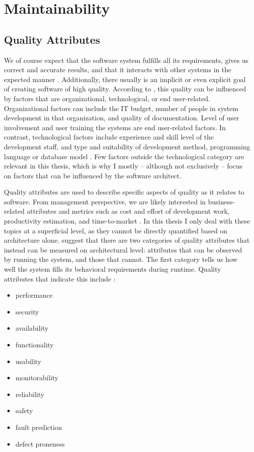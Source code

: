 \documentclass[utf8,english]{gradu3}
\begin{document}
\section{Maintainability}

\subsection{Quality Attributes}

We of course expect that the software system fulfills all its requirements, gives us correct and
accurate results, and that it interacts with other systems in the expected manner
\parencite[76]{Bass1998}. Additionally, there usually is an implicit or even explicit goal of creating software of high quality.
According to \textcite[602]{Gorla2010}, this quality
can be influenced by factors that are organizational,
technological, or end user-related. Organizational factors can
include the IT budget, number of people in system development in that
organization, and quality of documentation. Level of user involvement and user
training the systems are end user-related factors. In contrast, technological
factors include experience and skill level of the development staff, and type
and suitability of development method, programming language or database model
\parencite[602]{Gorla2010}. Few factors outside the technological category are
relevant in this thesis, which is why I mostly -- although not exclusively --
focus on factors that can be influenced by the software architect.

Quality attributes are used to describe specific aspects of quality as
it relates to software. From management perspective, we are likely interested in
business-related attributes and metrics such as cost and effort of development
work, productivity estimation, and time-to-market
\parencites[60]{Arvanitou2017}[76]{Bass1998}. In this thesis I only deal with
these topics at a superficial level, as they cannot be directly quantified based
on architecture alone. \textcite[76]{Bass1998} suggest that there are two
categories of quality attributes that instead can be measured on architectural
level: attributes that can be observed by running the system, and those
that cannot. The first category tells us how well the system fills its
behavioral requirements during runtime. Quality attributes that indicate this
include \parencites[79-81]{Bass1998}[13]{Li2021}[60]{Arvanitou2017}:
\begin{itemize}
  \item performance
  \item security
  \item availability
  \item functionality
  \item usability
  \item monitorability
  \item reliability
  \item safety
  \item fault prediction
  \item defect proneness
\end{itemize}
\end{document}
